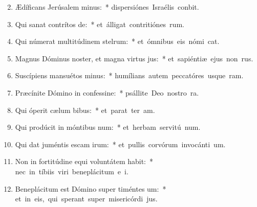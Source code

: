 \begin{flushleft}
\begin{enumerate}[leftmargin=*]
\setcounter{enumi}{1}


\item Ædíficans Jerúsalem minus:~* \mbox{dispersiónes Israélis conbit.}
\item Qui sanat contrítos de:~* \mbox{et álligat contritiónes rum.}
\item Qui númerat multitúdinem stelrum:~* \mbox{et ómnibus eis nómi cat.}
\item Magnus Dóminus noster, et magna virtus jus:~* \mbox{et sapiéntiæ ejus non  rus.}
\item Suscípiens mansuétos minus:~* \mbox{humílians autem peccatóres usque  ram.}
\item Præcínite Dómino in confessine:~* \mbox{psállite Deo nostro  ra.}
\item Qui óperit cælum bibus:~* \mbox{et parat ter am.}
\item Qui prodúcit in móntibus num:~* \mbox{et herbam servitú num.}
\item Qui dat juméntis escam irum:~* \mbox{et pullis corvórum invocánti um.}
\item Non in fortitúdine equi voluntátem habit:~* \mbox{nec in tíbiis viri beneplácitum e i.}
\item Beneplácitum est Dómino super timéntes um:~* \mbox{et in eis, qui sperant super misericórdi jus.}




\end{enumerate}
\end{flushleft}

